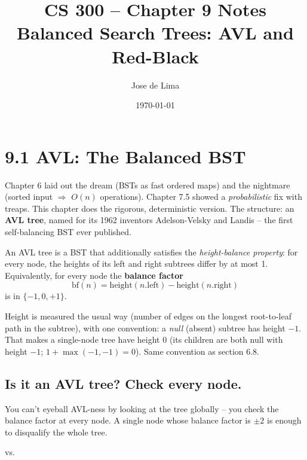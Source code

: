 \documentclass[11pt]{article}
\title{CS 300 -- Chapter 9 Notes\\\large Balanced Search Trees: AVL and Red-Black}
\author{Jose de Lima}
\date{\today}
\begin{document}
\maketitle

\section{9.1 AVL: The Balanced BST}

Chapter 6 laid out the dream (BSTs as fast ordered maps) and the nightmare (sorted input $\Rightarrow$ $O(n)$ operations). Chapter 7.5 showed a \emph{probabilistic} fix with treaps. This chapter does the rigorous, deterministic version. The structure: an \textbf{AVL tree}, named for its 1962 inventors Adelson-Velsky and Landis -- the first self-balancing BST ever published.

\begin{defnbox}
An AVL tree is a BST that additionally satisfies the \emph{height-balance property}: for every node, the heights of its left and right subtrees differ by at most 1. Equivalently, for every node the \textbf{balance factor} \[\text{bf}(n) = \text{height}(n.\text{left}) - \text{height}(n.\text{right})\] is in $\{-1, 0, +1\}$.
\end{defnbox}

Height is measured the usual way (number of edges on the longest root-to-leaf path in the subtree), with one convention: a \emph{null} (absent) subtree has height $-1$. That makes a single-node tree have height $0$ (its children are both null with height $-1$; $1 + \max(-1, -1) = 0$). Same convention as section 6.8.

\subsection*{Is it an AVL tree? Check every node.}

You can't eyeball AVL-ness by looking at the tree globally -- you check the balance factor at every node. A single node whose balance factor is $\pm 2$ is enough to disqualify the whole tree.

\begin{center}
\quad vs. \quad
{}
\end{center}
\end{document}
